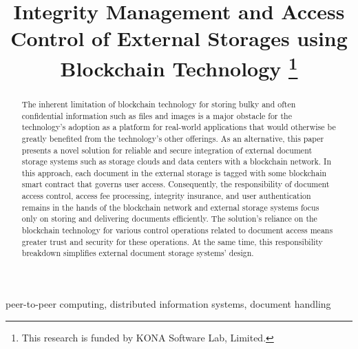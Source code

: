 \documentclass[conference]{IEEEtran}
\begin{document}
\title{Integrity Management and Access Control of External Storages using Blockchain Technology 
	\thanks{This research is funded by KONA Software Lab, Limited.}
}

\author{
	\and
}
\maketitle

\begin{abstract}
The inherent limitation of blockchain technology for storing bulky and often confidential information such as files and images is a major obstacle for the technology's adoption as a platform for real-world applications that would otherwise be greatly benefited from the technology's other offerings. As an alternative, this paper presents a novel solution for reliable and secure integration of external document storage systems such as storage clouds and data centers with a blockchain network. In this approach, each document in the external storage is tagged with some blockchain smart contract that governs user access. Consequently, the responsibility of document access control, access fee processing, integrity insurance, and user authentication remains in the hands of the blockchain network and external storage systems focus only on storing and delivering documents efficiently. The solution's reliance on the blockchain technology for various control operations related to document access means greater trust and security for these operations. At the same time, this responsibility breakdown simplifies external document storage systems' design.    
\end{abstract}

\begin{IEEEkeywords}
peer-to-peer computing, distributed information systems, document handling  
\end{IEEEkeywords}


\end{document}
